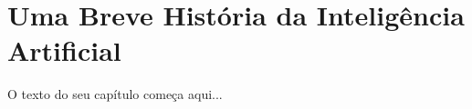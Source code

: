 
\chapter{Uma Breve História da Inteligência Artificial}
\label{cap:historia-ia}

O texto do seu capítulo começa aqui...